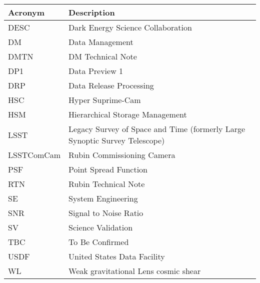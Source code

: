 \addtocounter{table}{-1}
\begin{longtable}{p{}p{}}\hline
\textbf{Acronym} & \textbf{Description}  \\\hline

DESC & Dark Energy Science Collaboration \\\hline
DM & Data Management \\\hline
DMTN & DM Technical Note \\\hline
DP1 & Data Preview 1 \\\hline
DRP & Data Release Processing \\\hline
HSC & Hyper Suprime-Cam \\\hline
HSM & Hierarchical Storage Management \\\hline
LSST & Legacy Survey of Space and Time (formerly Large Synoptic Survey Telescope) \\\hline
LSSTComCam & Rubin Commissioning Camera \\\hline
PSF & Point Spread Function \\\hline
RTN & Rubin Technical Note \\\hline
SE & System Engineering \\\hline
SNR & Signal to Noise Ratio \\\hline
SV & Science Validation \\\hline
TBC & To Be Confirmed \\\hline
USDF & United States Data Facility \\\hline
WL & Weak gravitational Lens cosmic shear \\\hline
\end{longtable}
